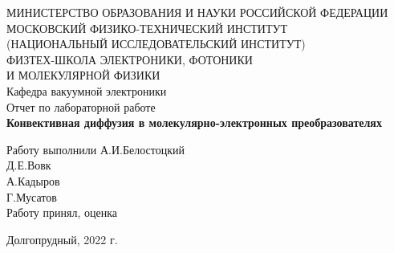 \documentclass[a4paper,12pt]{article}
\begin{document}
 

\begin{titlepage}
	\begin{center}
		\large 	МИНИСТЕРСТВО ОБРАЗОВАНИЯ И НАУКИ РОССИЙСКОЙ ФЕДЕРАЦИИ\\
				МОСКОВСКИЙ ФИЗИКО-ТЕХНИЧЕСКИЙ ИНСТИТУТ \\
				(НАЦИОНАЛЬНЫЙ ИССЛЕДОВАТЕЛЬСКИЙ ИНСТИТУТ)\\ 
				ФИЗТЕХ-ШКОЛА ЭЛЕКТРОНИКИ, ФОТОНИКИ \\
				И МОЛЕКУЛЯРНОЙ ФИЗИКИ \\
		
		
		\vspace{4.0 cm}
		\LARGE{Кафедра вакуумной электроники \\ 
		Отчет по лабораторной работе} \\ 
		\LARGE \textbf{Конвективная диффузия в молекулярно-электронных преобразователях} \\
	\end{center}
	\vspace{3 cm} \large

	\begin{flushleft}
		Работу выполнили \hspace{5.5cm}  \underline{\hspace{3cm}} А.И.Белостоцкий \\	
		\hspace{9.8cm}  \underline{\hspace{3cm}} Д.Е.Вовк \\
		\hspace{9.8cm}  \underline{\hspace{3cm}} А.Кадыров \\
		\hspace{9.8cm}  \underline{\hspace{3cm}} Г.Мусатов \\
		\vspace{2cm}
		Работу принял, оценка \hspace{4.3cm} \underline{\hspace{3cm}}
	\end{flushleft}
	
	
	\vfill

	\begin{center}
	Долгопрудный, 2022 г.
	\end{center}
\end{titlepage}                                                                      
\end{document}
